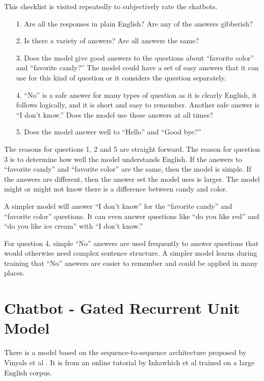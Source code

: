 This checklist is visited repeatedly to subjectively rate the chatbots.

\begin{itemize}
	
	\item [1.] Are all the responses in plain English? Are any of the answers gibberish?
	
	\item [2.] Is there a  variety of answers? Are all answers the same?
	
	\item [3.] Does the model give good answers to the questions about ``favorite color'' and ``favorite candy?'' The model could have a set of easy answers that it can use for this kind of question or it considers the question separately. 
	
	\item [4.] ``No'' is a safe answer for many types of question as it is clearly English, it follows logically, and it is short and easy to remember. Another safe answer is ``I don't know.'' Does the model use these answers at all times?
	
	\item [5.] Does the model answer well to ``Hello'' and ``Good bye?''
	
\end{itemize}

The reasons for questions 1, 2 and 5 are straight forward. The reason for question 3 is to determine how well the model understands English. If the answers to ``favorite candy'' and ``favorite color'' are the same, then the model is simple. If the answers are different, then the answer set the model uses is larger. The model might or might not know there is a difference between candy and color. 

A simpler model will answer ``I don't know'' for the ``favorite candy'' and ``favorite color'' questions. It can even answer questions like ``do you like red'' and ``do you like ice cream'' with ``I don't know.'' 

For question 4, simple ``No'' answers are used frequently to answer questions that would otherwise need complex sentence structure. A simpler model learns during training that ``No'' answers are easier to remember and could be applied in many places.

\section{Chatbot - Gated Recurrent Unit Model}
There is a model based on the sequence-to-sequence architecture proposed by Vinyals et al \cite{DBLP:journals/corr/VinyalsL15}.
It is from an online tutorial by  Inkawhich et al \cite{2018Inkawhich} trained on a large English corpus. 

